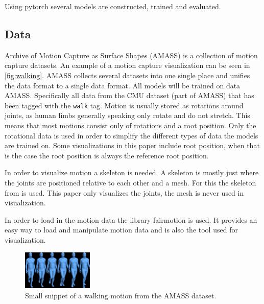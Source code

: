 Using pytorch \cite{pytorch} several models are constructed, trained and evaluated.

\subsection{Data}\label{subsec:data}
Archive of Motion Capture as Surface Shapes (AMASS) \cite{AMASS:2019} is a collection of motion capture datasets. An example of a motion capture visualization can be seen in \autoref{fig:walking}. AMASS collects several datasets into one single place and unifies the data format to a single data format. All models will be trained on data AMASS. Specifically all data from the CMU \cite{cmuWEB} dataset (part of AMASS) that has been tagged with the \texttt{walk} tag. Motion is usually stored as rotations around joints, as human limbs generally speaking only rotate and do not stretch. This means that most motions consist only of rotations and a root position. Only the rotational data is used in order to simplify the different types of data the models are trained on. Some visualizations in this paper include root position, when that is the case the root position is always the reference root position.

In order to visualize motion a skeleton is needed. A skeleton is mostly just where the joints are positioned relative to each other and a mesh. For this the skeleton from \cite{MANO} is used. This paper only visualizes the joints, the mesh is never used in visualization.

In order to load in the motion data the library fairmotion \cite{gopinath2020fairmotion} is used. It provides an easy way to load and manipulate motion data and is also the tool used for visualization.


\begin{figure}[h]
\centering
\includegraphics[width=0.3\textwidth]{img/02_01}
\caption{Small snippet of a walking motion from the AMASS dataset.}
\label{fig:walking}
\end{figure}



